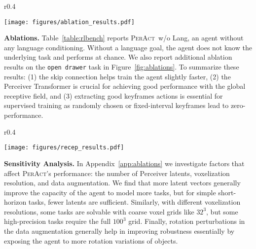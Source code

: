 \documentclass{article}
\newcommand{\appsecref}[1]{Appendix~\ref{#1}}
\newcommand{\figref}[1]{Figure~\ref{#1}}
\newcommand{\tabref}[1]{Table~\ref{#1}}
\newcommand{\unet}{C2FARM-BC~}
\newcommand{\model}{\textsc{PerAct}}
\begin{document}
\begin{wrapfigure}{r}{0.4\textwidth}
  
  \begin{center}
    \vspace{-0.8cm}
    \texttt{[image: figures/ablation\_results.pdf]}

  \vspace{-0.05cm}
  \caption{\textbf{Ablation Experiments.} Success rate of \model~after ablating key components.}
  \label{fig:ablations}
  \end{center}
  \vspace{-1em}
\end{wrapfigure}
\vspace{-0.05cm}
\textbf{Ablations.} \tabref{table:rlbench} reports \model~w/o Lang, an agent without any language conditioning. Without a language goal, the agent does not know the underlying task and performs at chance. We also report additional ablation results on the \texttt{open drawer} task in \figref{fig:ablations}. To summarize these results: (1) the skip connection helps train the agent slightly faster, (2) the Perceiver Transformer is crucial for achieving good performance with the global receptive field, and (3) extracting good keyframes actions is essential for supervised training as randomly chosen or fixed-interval keyframes lead to zero-performance.

\begin{wrapfigure}{r}{0.4\textwidth}
    \vspace{-1.63cm}
  \begin{center}
    \texttt{[image: figures/recep\_results.pdf]}
  \end{center}
  \vspace{-1.2em}
  \caption{\textbf{Global vs. Local Receptive Field Experiments.} Success rates of \model~against various \unet~\citep{c2farm} baselines}
  \label{fig:recep_results}
  \vspace{-0.5cm}
\end{wrapfigure}
\textbf{Sensitivity Analysis.} In \appsecref{app:ablations} we investigate factors that affect \model's performance: the number of Perceiver latents, voxelization resolution, and data augmentation. We find that more latent vectors generally improve the capacity of the agent to model more tasks, but for simple short-horizon tasks, fewer latents are sufficient. Similarly, with different voxelization resolutions, some tasks are solvable with coarse voxel grids like $32^3$, but some high-precision tasks require the full $100^3$ grid. Finally, rotation perturbations in the data augmentation generally help in improving robustness essentially by exposing the agent to more rotation variations of objects.
\end{document}
